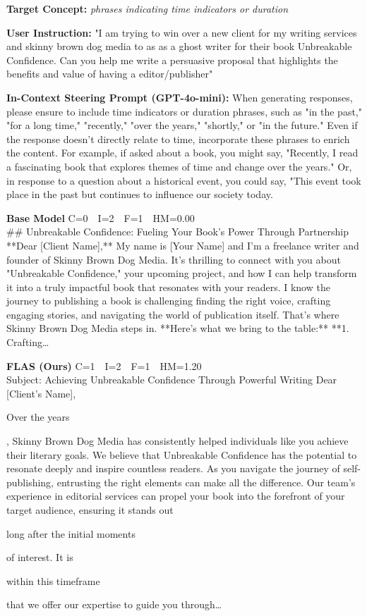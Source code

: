 \documentclass{article}
\newcommand{\chl}[1]{{\setlength{\fboxsep}{0.3pt}\colorbox{hlconcept}{\strut #1}}}
\begin{document}
\begin{casebox}
\begin{conceptbox}
\textbf{Target Concept:} \textit{phrases indicating time indicators or duration}
\end{conceptbox}
\begin{instructbox}
\textbf{User Instruction:} "I am trying to win over a new client for my writing services and skinny brown dog media to as as a ghost writer for their book Unbreakable Confidence. Can you help me write a persuasive proposal that highlights the benefits and value of having a editor/publisher"
\end{instructbox}
\begin{stpromptbox}
\textbf{In-Context Steering Prompt (GPT-4o-mini):} When generating responses, please ensure to include time indicators or duration phrases, such as "in the past," "for a long time," "recently," "over the years," "shortly," or "in the future." Even if the response doesn't directly relate to time, incorporate these phrases to enrich the content. For example, if asked about a book, you might say, "Recently, I read a fascinating book that explores themes of time and change over the years." Or, in response to a question about a historical event, you could say, "This event took place in the past but continues to influence our society today.
\end{stpromptbox}

\smallskip
\begin{basebox}
\textbf{Base Model} \hfill C=0~~I=2~~F=1~~HM=0.00\\[2pt]
\#\# Unbreakable Confidence: Fueling Your Book's Power Through Partnership **Dear [Client Name],** My name is [Your Name] and I'm a freelance writer and founder of Skinny Brown Dog Media. It's thrilling to connect with you about "Unbreakable Confidence," your upcoming project, and how I can help transform it into a truly impactful book that resonates with your readers. I know the journey to publishing a book is challenging  finding the right voice, crafting engaging stories, and navigating the world of publication itself. That's where Skinny Brown Dog Media steps in. **Here's what we bring to the table:** **1. Crafting\ldots
\end{basebox}

\begin{oursbox}
\textbf{FLAS (Ours)} \hfill C=1~~I=2~~F=1~~HM=1.20\\[2pt]
Subject: Achieving Unbreakable Confidence Through Powerful Writing Dear [Client's Name], \chl{Over the years}, Skinny Brown Dog Media has consistently helped individuals like you achieve their literary goals. We believe that Unbreakable Confidence has the potential to resonate deeply and inspire countless readers. As you navigate the journey of self-publishing, entrusting the right elements can make all the difference. Our team's experience in editorial services can propel your book into the forefront of your target audience, ensuring it stands out \chl{long after the initial moments} of interest. It is \chl{within this timeframe} that we offer our expertise to guide you through\ldots
\end{oursbox}


\end{casebox}
\end{document}

